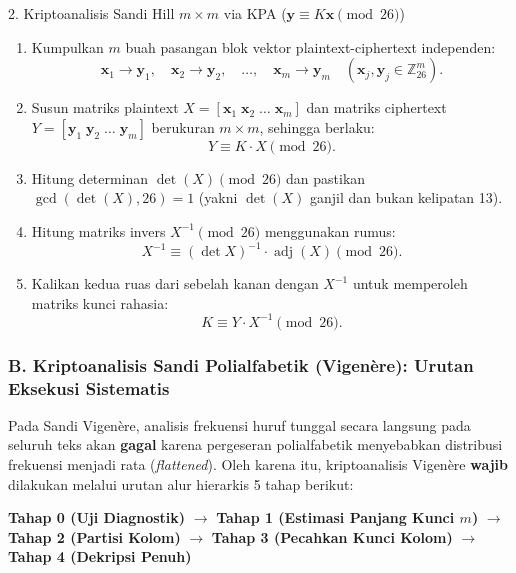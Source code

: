 \documentclass[11pt,a4paper]{article}
\begin{document}
\begin{teoribox}{2. Kriptoanalisis Sandi Hill $m \times m$ via KPA ($\mathbf{y} \equiv K \mathbf{x} \pmod{26}$)}
\begin{enumerate}[label=\textbf{Langkah \arabic*:}, leftmargin=*]
    \item Kumpulkan $m$ buah pasangan blok vektor plaintext-ciphertext independen:
    \[
    \mathbf{x}_1 \to \mathbf{y}_1, \quad \mathbf{x}_2 \to \mathbf{y}_2, \quad \dots, \quad \mathbf{x}_m \to \mathbf{y}_m \quad (\mathbf{x}_j, \mathbf{y}_j \in \mathbb{Z}_{26}^m).
    \]
    \item Susun matriks plaintext $X = [\mathbf{x}_1 \; \mathbf{x}_2 \; \dots \; \mathbf{x}_m]$ dan matriks ciphertext $Y = [\mathbf{y}_1 \; \mathbf{y}_2 \; \dots \; \mathbf{y}_m]$ berukuran $m \times m$, sehingga berlaku:
    \[
    Y \equiv K \cdot X \pmod{26}.
    \]
    \item Hitung determinan $\det(X) \pmod{26}$ dan pastikan $\gcd(\det(X), 26) = 1$ (yakni $\det(X)$ ganjil dan bukan kelipatan 13).
    \item Hitung matriks invers $X^{-1} \pmod{26}$ menggunakan rumus:
    \[
    X^{-1} \equiv (\det X)^{-1} \cdot \operatorname{adj}(X) \pmod{26}.
    \]
    \item Kalikan kedua ruas dari sebelah kanan dengan $X^{-1}$ untuk memperoleh matriks kunci rahasia:
    \[
    K \equiv Y \cdot X^{-1} \pmod{26}.
    \]
\end{enumerate}
\end{teoribox}

\newpage
\subsubsection{B. Kriptoanalisis Sandi Polialfabetik (Vigenère): Urutan Eksekusi Sistematis}

Pada Sandi Vigenère, analisis frekuensi huruf tunggal secara langsung pada seluruh teks akan \textbf{gagal} karena pergeseran polialfabetik menyebabkan distribusi frekuensi menjadi rata (\textit{flattened}). Oleh karena itu, kriptoanalisis Vigenère \textbf{wajib} dilakukan melalui urutan alur hierarkis 5 tahap berikut:

\begin{center}
\small
\begin{tcolorbox}[colback=white, colframe=colanalisis, title=\textbf{Bagan Alur Urutan Metode Kriptoanalisis Sandi Vigenère}]
\textbf{Tahap 0 (Uji Diagnostik)} $\to$ \textbf{Tahap 1 (Estimasi Panjang Kunci $m$)} $\to$ \textbf{Tahap 2 (Partisi Kolom)} $\to$ \textbf{Tahap 3 (Pecahkan Kunci Kolom)} $\to$ \textbf{Tahap 4 (Dekripsi Penuh)}
\end{tcolorbox}
\end{center}
\end{document}
